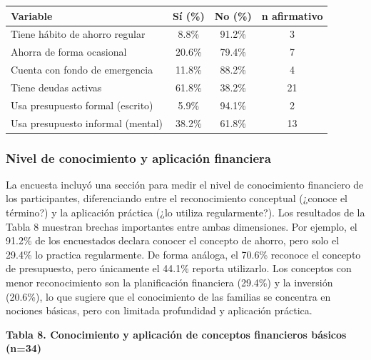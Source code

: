 \documentclass[12pt,letterpaper]{article}
\begin{document}
\begin{longtable}[]{@{}lccc@{}}
\toprule\noalign{}
Variable & Sí (\%) & No (\%) & n afirmativo \\
\midrule\noalign{}
\endhead
\bottomrule\noalign{}
\endlastfoot
Tiene hábito de ahorro regular & 8.8\% & 91.2\% & 3 \\
Ahorra de forma ocasional & 20.6\% & 79.4\% & 7 \\
Cuenta con fondo de emergencia & 11.8\% & 88.2\% & 4 \\
Tiene deudas activas & 61.8\% & 38.2\% & 21 \\
Usa presupuesto formal (escrito) & 5.9\% & 94.1\% & 2 \\
Usa presupuesto informal (mental) & 38.2\% & 61.8\% & 13 \\
\end{longtable}

\subsubsection{\texorpdfstring{\textbf{Nivel de conocimiento y aplicación financiera}}{Nivel de conocimiento y aplicación financiera}}\label{nivel-de-conocimiento-y-aplicaciuxf3n-financiera}

La encuesta incluyó una sección para medir el nivel de conocimiento financiero de los participantes, diferenciando entre el reconocimiento conceptual (¿conoce el término?) y la aplicación práctica (¿lo utiliza regularmente?). Los resultados de la Tabla 8 muestran brechas importantes entre ambas dimensiones. Por ejemplo, el 91.2\% de los encuestados declara conocer el concepto de ahorro, pero solo el 29.4\% lo practica regularmente. De forma análoga, el 70.6\% reconoce el concepto de presupuesto, pero únicamente el 44.1\% reporta utilizarlo. Los conceptos con menor reconocimiento son la planificación financiera (29.4\%) y la inversión (20.6\%), lo que sugiere que el conocimiento de las familias se concentra en nociones básicas, pero con limitada profundidad y aplicación práctica.

\textbf{Tabla 8. Conocimiento y aplicación de conceptos financieros básicos (n=34)}
\end{document}
